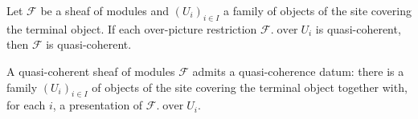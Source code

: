 \begin{lemma}
  \label{mk-lem:isQuasicoherent_of_coversTop_mathlib}
  \mathlibok

  Let \(\mathcal{F}\) be a sheaf of modules and \((U_i)_{i \in I}\) a family of objects of the site
  covering the terminal object. If each over-picture restriction \(\mathcal{F}.\operatorname{over} U_i\)
  is quasi-coherent, then \(\mathcal{F}\) is quasi-coherent.
\end{lemma}

\begin{lemma}
  \label{mk-lem:nonempty_quasicoherentData_mathlib}
  \mathlibok

  A quasi-coherent sheaf of modules \(\mathcal{F}\) admits a quasi-coherence datum: there is a family
  \((U_i)_{i \in I}\) of objects of the site covering the terminal object together with, for each \(i\),
  a presentation of \(\mathcal{F}.\operatorname{over} U_i\).
\end{lemma}

